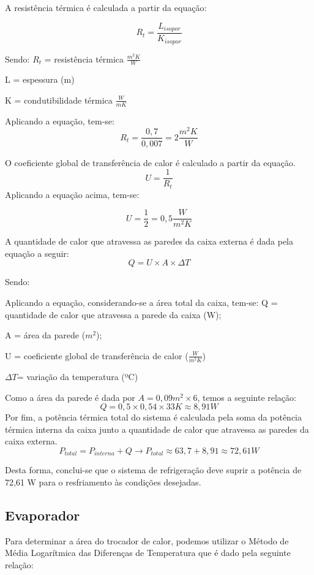 		A resistência térmica é calculada a partir da equação:
		
		$$
		R_t = \frac{L_{isopor}}{K_{isopor}}
		$$
	
	Sendo:
	$R_t$ = resistência térmica $\frac{m^2K}{W}$
	
	L = espessura (m)
	
	K = condutibilidade térmica $\frac{W}{mK}$
	
	Aplicando a equação, tem-se:
	$$
	R_t = \frac{0,7}{0,007} = 2\frac{m^2K}{W}
	$$
	
	O coeficiente global de transferência de calor é calculado a partir da equação.
	\begin{equation}
	U = \frac{1}{R_t}
	\end{equation}
	Aplicando a equação acima, tem-se:

	$$
	U = \frac{1}{2} = 0,5 \frac{W}{m^2 K}
	$$
	
	A quantidade de calor que atravessa as paredes da caixa externa é dada pela equação a seguir:
	\begin{equation}
	Q = U \times A \times \Delta T
	\end{equation}
	
	Sendo:
	
	
	Aplicando a equação, considerando-se a área total da caixa, tem-se:
	Q = quantidade de calor que atravessa a parede da caixa (W);
	
	A = área da parede ($m^2$);
	
	U = coeficiente global de transferência de calor ($\frac{W}{m^2K}$)
	
	$\Delta T$= variação da temperatura (ºC)
	
	Como a área da parede é dada por $A = 0,09 m^2 \times 6$, temos a seguinte relação:
	$$
	Q = 0,5 \times 0,54 \times 33K \approx 8,91 W
	$$
	Por fim, a potência térmica total do sistema é calculada pela soma da potência térmica interna da caixa junto a quantidade de calor que atravessa as paredes da caixa externa.
	$$
	P_{total} = P_{interna} + Q \longrightarrow P_{total} \approx 63,7 + 8,91 \approx 72,61W
	$$
	
	Desta forma, conclui-se que o sistema de refrigeração deve suprir a potência de 72,61 W para o resfriamento às condições desejadas.
	
	\subsection{Evaporador}
	Para determinar a área do trocador de calor, podemos utilizar o Método de  Média Logarítmica das Diferenças de Temperatura que é dado pela seguinte relação:
	
